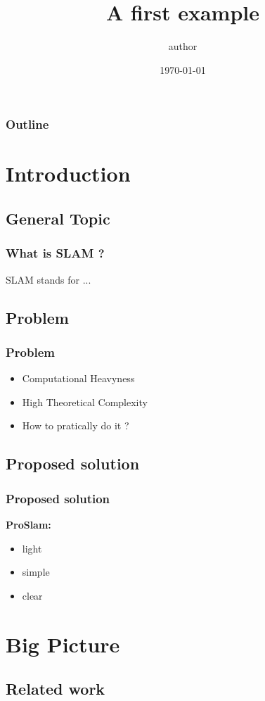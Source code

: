 \documentclass[16pt]{beamer}
\title {A first example}
\author{author}
\date{\today}
\begin{document}
\frame{\titlepage}

\begin{frame}
   \frametitle{Outline}
      \tableofcontents
\end{frame}

\section{ Introduction }

\subsection*{General Topic}
\begin{frame}
  \frametitle{What is SLAM ? }
  SLAM stands for ...
\end{frame}


\subsection{Problem }
\begin{frame}
  \frametitle{Problem }
  \begin{itemize}
  \item Computational Heavyness
  \item High Theoretical Complexity
  \item How to pratically do it ?
  \end{itemize}
\end{frame}

\subsection{Proposed solution}
\begin{frame}
  \frametitle{Proposed solution }
 \textbf{ ProSlam: } \\
 \begin{itemize}
 \item light
 \item simple
 \item clear
 \end{itemize}
 
\end{frame}

\section{ Big Picture}

\subsection{Related work}
\end{document}
